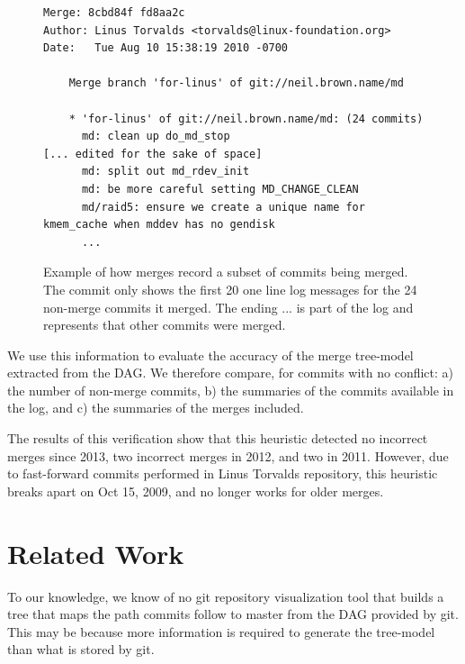 \documentclass[conference, draftclsnofoot, draft]{IEEEtran}
\begin{document}
\begin{figure}[htbp]
  \centering
{\tiny
\begin{verbatim}
Merge: 8cbd84f fd8aa2c
Author: Linus Torvalds <torvalds@linux-foundation.org>
Date:   Tue Aug 10 15:38:19 2010 -0700

    Merge branch 'for-linus' of git://neil.brown.name/md
    
    * 'for-linus' of git://neil.brown.name/md: (24 commits)
      md: clean up do_md_stop
[... edited for the sake of space]
      md: split out md_rdev_init
      md: be more careful setting MD_CHANGE_CLEAN
      md/raid5: ensure we create a unique name for kmem_cache when mddev has no gendisk
      ...
\end{verbatim}}
  \caption{Example of how merges record a subset of commits being merged. The commit only shows the first 20 one line log messages for the 24 non-merge commits
    it merged. The ending ... is part of the log and represents that other commits were merged.}
  \label{fig:sampleMerge}
\end{figure}

We use this information to evaluate the accuracy of the merge tree-model extracted from the DAG. We therefore compare, for commits with no conflict: a) the number of
non-merge commits, b) the summaries of the commits available in the log, and c) the summaries of the merges included.

The results of this verification show that this heuristic detected no incorrect merges since 2013, two incorrect merges in 2012, and two in 2011. However, due
to fast-forward commits performed in Linus Torvalds repository, this heuristic breaks apart on Oct 15, 2009, and no longer works for older merges. 



\section{Related Work}




To our knowledge, we know of no git repository visualization tool that builds
a tree that maps the path commits follow to master
from the DAG provided by git. This may be because more information is required
to generate the tree-model than what is stored by git. %
\end{document}
